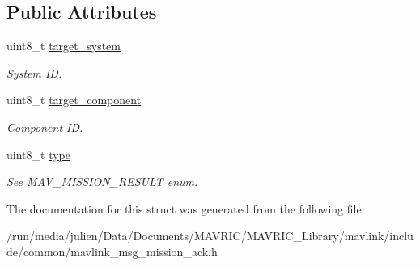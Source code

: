 \subsection*{Public Attributes}
\begin{DoxyCompactItemize}
\item 
\hypertarget{struct____mavlink__mission__ack__t_ab8ef2eb9bff8975de92406b94c18d907}{uint8\+\_\+t \hyperlink{struct____mavlink__mission__ack__t_ab8ef2eb9bff8975de92406b94c18d907}{target\+\_\+system}}\label{struct____mavlink__mission__ack__t_ab8ef2eb9bff8975de92406b94c18d907}

\begin{DoxyCompactList}\small\item\em System I\+D. \end{DoxyCompactList}\item 
\hypertarget{struct____mavlink__mission__ack__t_ab254af31fbc3e92ab8cffcea8bd78fba}{uint8\+\_\+t \hyperlink{struct____mavlink__mission__ack__t_ab254af31fbc3e92ab8cffcea8bd78fba}{target\+\_\+component}}\label{struct____mavlink__mission__ack__t_ab254af31fbc3e92ab8cffcea8bd78fba}

\begin{DoxyCompactList}\small\item\em Component I\+D. \end{DoxyCompactList}\item 
\hypertarget{struct____mavlink__mission__ack__t_ad05f998d3b1bea0480eb25dcb82e0c92}{uint8\+\_\+t \hyperlink{struct____mavlink__mission__ack__t_ad05f998d3b1bea0480eb25dcb82e0c92}{type}}\label{struct____mavlink__mission__ack__t_ad05f998d3b1bea0480eb25dcb82e0c92}

\begin{DoxyCompactList}\small\item\em See M\+A\+V\+\_\+\+M\+I\+S\+S\+I\+O\+N\+\_\+\+R\+E\+S\+U\+L\+T enum. \end{DoxyCompactList}\end{DoxyCompactItemize}


The documentation for this struct was generated from the following file\+:\begin{DoxyCompactItemize}
\item 
/run/media/julien/\+Data/\+Documents/\+M\+A\+V\+R\+I\+C/\+M\+A\+V\+R\+I\+C\+\_\+\+Library/mavlink/include/common/mavlink\+\_\+msg\+\_\+mission\+\_\+ack.\+h\end{DoxyCompactItemize}
